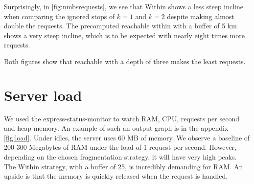 Surprisingly, in \autoref{fig:nmbsrequests}, we see that Within shows a less steep incline when comparing the ignored stops of $k=1$ and $k=2$ despite making almost double the requests. The precomputed reachable within with a buffer of 5 km shows a very steep incline, which is to be expected with nearly eight times more requests.

Both figures show that reachable with a depth of three makes the least requests.
\section{Server load}
\label{sec:load}
We used the express-status-monitor \cite{noauthor_express-status-monitor_2022} to watch RAM, CPU, requests per second and heap memory. An example of such an output graph is in the appendix \autoref{fig:load}. 
Under idles, the server uses 60 MB of memory. We observe a baseline of 200-300 Megabytes of RAM under the load of 1 request per second. However, depending on the chosen fragmentation strategy, it will have very high peaks. The Within strategy, with a buffer of 25, is incredibly demanding for RAM. An upside is that the memory is quickly released when the request is handled. 

